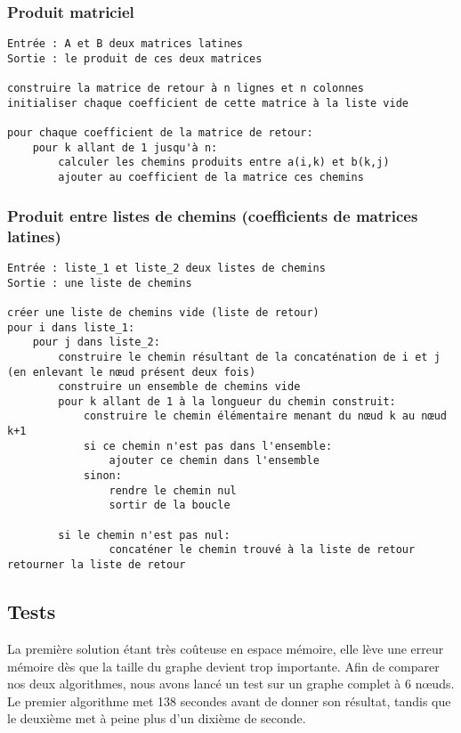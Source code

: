\documentclass{scrartcl}
\begin{document}
    \subsubsection{Produit matriciel}
      \begin{lstlisting}
Entrée : A et B deux matrices latines
Sortie : le produit de ces deux matrices

construire la matrice de retour à n lignes et n colonnes
initialiser chaque coefficient de cette matrice à la liste vide

pour chaque coefficient de la matrice de retour:
    pour k allant de 1 jusqu'à n:
        calculer les chemins produits entre a(i,k) et b(k,j)
        ajouter au coefficient de la matrice ces chemins
      \end{lstlisting}

    \subsubsection{Produit entre listes de chemins (coefficients de matrices
    latines)}
      \begin{lstlisting}
Entrée : liste_1 et liste_2 deux listes de chemins
Sortie : une liste de chemins

créer une liste de chemins vide (liste de retour)
pour i dans liste_1:
    pour j dans liste_2:
        construire le chemin résultant de la concaténation de i et j (en enlevant le nœud présent deux fois)
        construire un ensemble de chemins vide
        pour k allant de 1 à la longueur du chemin construit:
            construire le chemin élémentaire menant du nœud k au nœud k+1
            si ce chemin n'est pas dans l'ensemble:
                ajouter ce chemin dans l'ensemble
            sinon:
                rendre le chemin nul
                sortir de la boucle

        si le chemin n'est pas nul:
                concaténer le chemin trouvé à la liste de retour
retourner la liste de retour
			\end{lstlisting}

  \subsection{Tests}
    La première solution étant très coûteuse en espace mémoire, elle lève une
    erreur mémoire dès que la taille du graphe devient trop importante.
    Afin de comparer nos deux algorithmes, nous avons lancé un test sur un
    graphe complet à 6 nœuds. Le premier algorithme met 138 secondes avant de
    donner son résultat, tandis que le deuxième met à peine plus d'un dixième
    de seconde.
\end{document}
